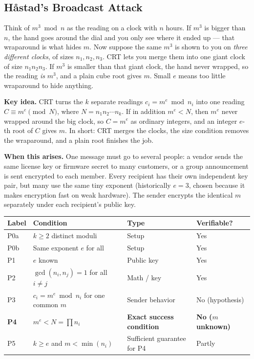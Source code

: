 \documentclass[11pt]{article}
\theoremstyle{definition}
\theoremstyle{remark}
\newcommand{\minorhead}[1]{\par\medskip\noindent{\large\bfseries\itshape #1}\par\nopagebreak\smallskip}
\begin{document}
\subsection{Håstad's Broadcast Attack}\label{sec:hastad}

\begin{intuition}
Think of $m^3 \bmod n$ as the reading on a clock with $n$ hours. If $m^3$ is bigger than $n$, the hand goes around the dial and you only see where it ended up --- that wraparound is what hides $m$. Now suppose the same $m^3$ is shown to you on \emph{three different clocks}, of sizes $n_1,n_2,n_3$. CRT lets you merge them into one giant clock of size $n_1n_2n_3$. If $m^3$ is smaller than that giant clock, the hand never wrapped, so the reading \emph{is} $m^3$, and a plain cube root gives $m$. Small $e$ means too little wraparound to hide anything.
\end{intuition}

\textbf{Key idea.} CRT turns the $k$ separate readings $c_i=m^e \bmod n_i$ into one reading $C\equiv m^e \pmod N$, where $N=n_1n_2\cdots n_k$. If in addition $m^e<N$, then $m^e$ never wrapped around the big clock, so $C=m^e$ as ordinary integers, and an integer $e$-th root of $C$ gives $m$. In short: CRT merges the clocks, the size condition removes the wraparound, and a plain root finishes the job.

\textbf{When this arises.} One message must go to several people: a vendor sends the same license key or firmware secret to many customers, or a group announcement is sent encrypted to each member. Every recipient has their own independent key pair, but many use the same tiny exponent (historically $e=3$, chosen because it makes encryption fast on weak hardware). The sender encrypts the identical $m$ separately under each recipient's public key.

\minorhead{Setup}
\begin{center}
\begin{tabular}{@{}>{\raggedright\arraybackslash}p{1.1cm}>{\raggedright\arraybackslash}p{7.9cm}>{\raggedright\arraybackslash}p{3.4cm}>{\raggedright\arraybackslash}p{2.6cm}@{}}
\toprule
\textbf{Label} & \textbf{Condition} & \textbf{Type} & \textbf{Verifiable?} \\
\midrule
P0a & $k\ge2$ distinct moduli & Setup & Yes \\
P0b & Same exponent $e$ for all & Setup & Yes \\
P1 & $e$ known & Public key & Yes \\
P2 & $\gcd(n_i,n_j)=1$ for all $i\ne j$ & Math / key & Yes \\
P3 & $c_i=m^e\bmod n_i$ for one common $m$ & Sender behavior & No (hypothesis) \\
\textbf{P4} & \textbf{$m^e<N=\prod n_i$} & \textbf{Exact success condition} & \textbf{No ($m$ unknown)} \\
P5 & $k\ge e$ and $m<\min(n_i)$ & Sufficient guarantee for P4 & Partly \\
\bottomrule
\end{tabular}
\end{center}
\end{document}
